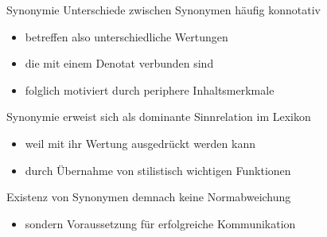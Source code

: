\begin{frame}{Synonymie}
\onslide<+->
Unterschiede zwischen Synonymen häufig konnotativ
\Halbzeile
\begin{itemize}[<+->]
	\item		betreffen also unterschiedliche Wertungen
	\item		die mit einem Denotat verbunden sind
	\item		folglich motiviert durch periphere Inhaltsmerkmale
\end{itemize}
\onslide<+->
\Zeile
\begin{exe}
	\ex\label{ex:synonymie-008}
    \begin{xlist}
		 \onslide<+->
		 \onslide<+->
		 \onslide<+->
	\end{xlist}
\end{exe}
\end{frame}

\begin{frame}{Synonymie}
\onslide<+->
erweist sich als dominante Sinnrelation im Lexikon
\Halbzeile
\begin{itemize}[<+->]
	\item		weil mit ihr Wertung ausgedrückt werden kann
	\item		durch Übernahme von stilistisch wichtigen Funktionen
\end{itemize}
\onslide<+->
\Zeile
Existenz von Synonymen demnach keine Normabweichung
\Halbzeile
\begin{itemize}[<+->]
	\item		sondern Voraussetzung für erfolgreiche Kommunikation
\end{itemize}
\end{frame}

